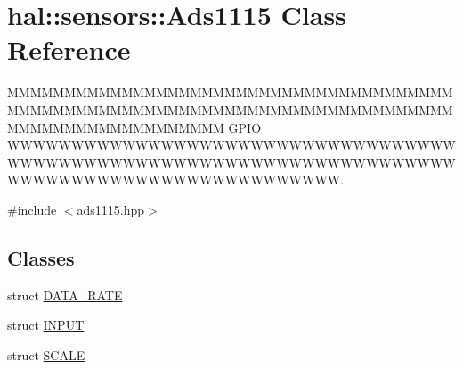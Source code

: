 \hypertarget{classhal_1_1sensors_1_1_ads1115}{}\section{hal\+:\+:sensors\+:\+:Ads1115 Class Reference}
\label{classhal_1_1sensors_1_1_ads1115}


M\+M\+M\+M\+M\+M\+M\+M\+M\+M\+M\+M\+M\+M\+M\+M\+M\+M\+M\+M\+M\+M\+M\+M\+M\+M\+M\+M\+M\+M\+M\+M\+M\+M\+M\+M\+M\+M\+M\+M\+M\+M\+M\+M\+M\+M\+M\+M\+M\+M\+M\+M\+M\+M\+M\+M\+M\+M\+M\+M\+M\+M\+M\+M\+M\+M\+M\+M\+M\+M\+M\+M\+M\+M\+M\+M\+M\+M\+M\+M\+M\+M\+M\+M\+M\+M\+M\+M\+M\+M\+M\+M\+M\+M\+M\+M\+M G\+P\+I\+O W\+W\+W\+W\+W\+W\+W\+W\+W\+W\+W\+W\+W\+W\+W\+W\+W\+W\+W\+W\+W\+W\+W\+W\+W\+W\+W\+W\+W\+W\+W\+W\+W\+W\+W\+W\+W\+W\+W\+W\+W\+W\+W\+W\+W\+W\+W\+W\+W\+W\+W\+W\+W\+W\+W\+W\+W\+W\+W\+W\+W\+W\+W\+W\+W\+W\+W\+W\+W\+W\+W\+W\+W\+W\+W\+W\+W\+W\+W\+W\+W\+W\+W\+W\+W\+W\+W\+W\+W\+W\+W\+W\+W\+W\+W\+W.  




{\ttfamily \#include $<$ads1115.\+hpp$>$}

\subsection*{Classes}
\begin{DoxyCompactItemize}
\item 
struct \hyperlink{structhal_1_1sensors_1_1_ads1115_1_1_d_a_t_a___r_a_t_e}{D\+A\+T\+A\+\_\+\+R\+A\+T\+E}
\item 
struct \hyperlink{structhal_1_1sensors_1_1_ads1115_1_1_i_n_p_u_t}{I\+N\+P\+U\+T}
\item 
struct \hyperlink{structhal_1_1sensors_1_1_ads1115_1_1_s_c_a_l_e}{S\+C\+A\+L\+E}
\end{DoxyCompactItemize}
